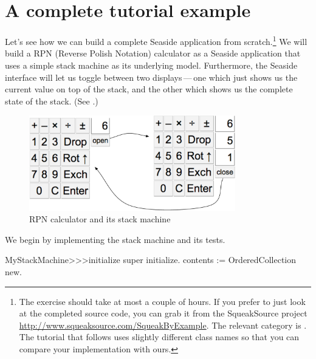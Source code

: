\documentclass[a4paper,10pt,twoside]{book}
\begin{document}
\section{A complete tutorial example}


Let's see how we can build a complete Seaside application from scratch.\footnote{The exercise should take at most a couple of hours. If you prefer to just look at the completed source code, you can grab it from the SqueakSource project \url{http://www.squeaksource.com/SqueakByExample}.
The relevant category is . The tutorial that follows uses slightly different class names so that you can compare your implementation with ours.}
We will build a RPN (Reverse Polish Notation) calculator as a Seaside application that uses a simple stack machine as its underlying model.
Furthermore, the Seaside interface will let us toggle between two displays\,---\,one which just shows us the current value on top of the stack, and the other which shows us the complete state of the stack.
(See .)

\begin{figure}[ht]
\begin{center}
\includegraphics[width=0.8\textwidth]{stackMachine}
\caption{RPN calculator and its stack machine}
\label{fig:stackMachine}
\end{center}
\end{figure}

We begin by implementing the stack machine and its tests.


\begin{code}{}
MyStackMachine>>>initialize
	super initialize.
	contents := OrderedCollection new.
\end{code}
\end{document}
